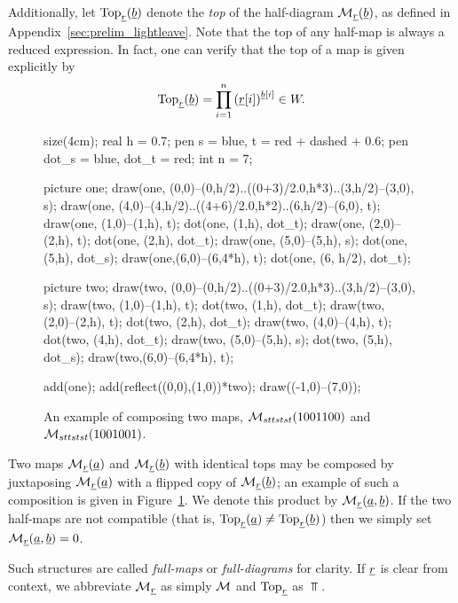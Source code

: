 Additionally, let $\operatorname{Top}_{\underline{r}}(\underline{b})$ denote the \emph{top} of the half-diagram $\mathcal M_{\underline{r}}(\underline{b})$, as defined in Appendix~\ref{sec:prelim_lightleave}.  
Note that the top of any half-map is always a reduced expression.  In fact, one can verify that the top of a map is given explicitly by
\begin{equation}
	\Top_{\ul r}(\ul b) = \prod_{i=1}^n \left( \ul r[i] \right)^{\ul b[i]} \in W.
	\label{eq:top}
\end{equation}

\begin{figure}[ht]
	\centering
	\begin{asy}
	size(4cm);
	real h = 0.7;
	pen s = blue, t = red + dashed + 0.6;
	pen dot_s = blue, dot_t = red;
	int n = 7;

	picture one;
	draw(one, (0,0)--(0,h/2)..((0+3)/2.0,h*3)..(3,h/2)--(3,0), s);
	draw(one, (4,0)--(4,h/2)..((4+6)/2.0,h*2)..(6,h/2)--(6,0), t);
	draw(one, (1,0)--(1,h), t);
	dot(one, (1,h), dot_t);
	draw(one, (2,0)--(2,h), t);
	dot(one, (2,h), dot_t);
	draw(one, (5,0)--(5,h), s);
	dot(one, (5,h), dot_s);
	draw(one,(6,0)--(6,4*h), t);
	dot(one, (6, h/2), dot_t);

	picture two;
	draw(two, (0,0)--(0,h/2)..((0+3)/2.0,h*3)..(3,h/2)--(3,0), s);
	draw(two, (1,0)--(1,h), t);
	dot(two, (1,h), dot_t);
	draw(two, (2,0)--(2,h), t);
	dot(two, (2,h), dot_t);
	draw(two, (4,0)--(4,h), t);
	dot(two, (4,h), dot_t);
	draw(two, (5,0)--(5,h), s);
	dot(two, (5,h), dot_s);
	draw(two,(6,0)--(6,4*h), t);

	add(one); add(reflect((0,0),(1,0))*two);
	draw((-1,0)--(7,0));
	\end{asy}
	\caption{An example of composing two maps, $\mathcal M_{sttstst}(1001100)$ and $\mathcal M_{sttstst}(1001001)$.}
	\label{fig:example_compose}
\end{figure}

Two maps $\mathcal M_{\underline{r}}(\underline{a})$ and $\mathcal M_{\underline{r}}(\underline{b})$ with identical tops may be composed by juxtaposing $\mathcal M_{\underline{r}}(\underline{a})$ with a flipped copy of $\mathcal M_{\underline{r}}(\underline{b})$; an example of such a composition is given in Figure~\ref{fig:example_compose}.  We denote this product by $\mathcal M_{\underline{r}}(\underline{a}, \underline{b})$.  If the two half-maps are not compatible (that is, $\operatorname{Top}_{\underline{r}}(\underline{a}) \neq \operatorname{Top}_{\underline{r}}(\underline{b})$) then we simply set $\mathcal M_{\underline{r}}(\underline{a}, \underline{b}) = 0$.

Such structures are called \emph{full-maps} or \emph{full-diagrams} for clarity.  If $\underline{r}$ is clear from context, we abbreviate $\mathcal M_{\underline{r}}$ as simply $\mathcal M$ and $\operatorname{Top}_{\underline{r}}$ as $\Top$.

